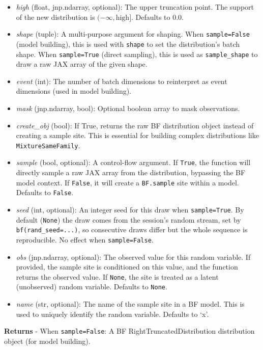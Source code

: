 \documentclass[
  letterpaper,
  DIV=11,
  numbers=noendperiod]{scrartcl}
\begin{document}
\begin{itemize}
\item
  \emph{high} (float, jnp.ndarray, optional): The upper truncation
  point. The support of the new distribution is
  \((-\infty, \text{high}]\). Defaults to 0.0.
\item
  \emph{shape} (tuple): A multi-purpose argument for shaping. When
  \texttt{sample=False} (model building), this is used with
  \texttt{shape} to set the distribution's batch shape. When
  \texttt{sample=True} (direct sampling), this is used as
  \texttt{sample\_shape} to draw a raw JAX array of the given shape.
\item
  \emph{event} (int): The number of batch dimensions to reinterpret as
  event dimensions (used in model building).
\item
  \emph{mask} (jnp.ndarray, bool): Optional boolean array to mask
  observations.
\item
  \emph{create\_obj} (bool): If True, returns the raw BF distribution
  object instead of creating a sample site. This is essential for
  building complex distributions like \texttt{MixtureSameFamily}.
\item
  \emph{sample} (bool, optional): A control-flow argument. If
  \texttt{True}, the function will directly sample a raw JAX array from
  the distribution, bypassing the BF model context. If \texttt{False},
  it will create a \texttt{BF.sample} site within a model. Defaults to
  \texttt{False}.
\item
  \emph{seed} (int, optional): An integer seed for this draw when
  \texttt{sample=True}. By default (\texttt{None}) the draw comes from
  the session's random stream, set by \texttt{bf(rand\_seed=...)}, so
  consecutive draws differ but the whole sequence is reproducible. No
  effect when \texttt{sample=False}.
\item
  \emph{obs} (jnp.ndarray, optional): The observed value for this random
  variable. If provided, the sample site is conditioned on this value,
  and the function returns the observed value. If \texttt{None}, the
  site is treated as a latent (unobserved) random variable. Defaults to
  \texttt{None}.
\item
  \emph{name} (str, optional): The name of the sample site in a BF
  model. This is used to uniquely identify the random variable. Defaults
  to `x'.
\end{itemize}

\textbf{Returns} - When \texttt{sample=False}: A BF
RightTruncatedDistribution distribution object (for model building).
\end{document}
